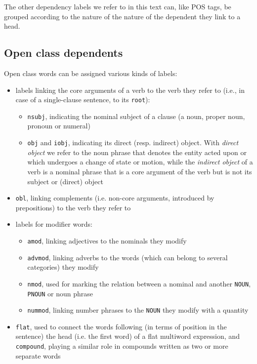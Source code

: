 The other dependency labels we refer to in this text can, like POS tags, be grouped according to the nature of the nature of the dependent they link to a head.

\subsection{Open class dependents}
Open class words can be assigned various kinds of labels: 
\begin{itemize}
    \item labels linking the core arguments of a verb to the verb they refer to (i.e., in case of a single-clause sentence, to its \texttt{root}): \begin{itemize}
        \item \texttt{nsubj}, indicating the nominal subject of a clause (a noun, proper noun, pronoun or numeral)
        \item \texttt{obj} and \texttt{iobj}, indicating its direct (resp. indirect) object. With \textit{direct object} we refer to the noun phrase that denotes the entity acted upon or which undergoes a change of state or motion, while the \textit{indirect object} of a verb is a nominal phrase that is a core argument of the verb but is not its subject or (direct) object 
    \end{itemize}
    \item \texttt{obl}, linking complements (i.e. non-core arguments, introduced by prepositions) to the verb they refer to
    \item labels for modifier words:    
    \begin{itemize}
        \item \texttt{amod}, linking adjectives to the nominals they modify
        \item \texttt{advmod}, linking adverbs to the words (which can belong to several categories) they modify
        \item \texttt{nmod}, used for marking the relation between a nominal and another \texttt{NOUN}, \texttt{PNOUN} or noun phrase
        \item \texttt{nummod}, linking number phrases to the \texttt{NOUN} they modify with a quantity
    \end{itemize}
    \item \texttt{flat}, used to connect the words following (in terms of position in the sentence) the head (i.e. the first word) of a flat multiword expression, and \texttt{compound}, playing a similar role in compounds written as two or more separate words

\end{itemize}
